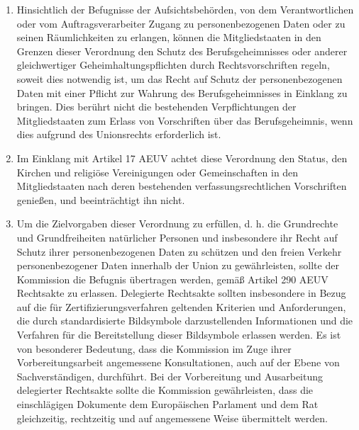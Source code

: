 \begin{enumerate}

   \item Hinsichtlich der Befugnisse der Aufsichtsbehörden, von dem Verantwortlichen oder vom Auftragsverarbeiter Zugang
    zu personenbezogenen Daten oder zu seinen Räumlichkeiten zu erlangen, können die Mitgliedstaaten in den Grenzen
    dieser Verordnung den Schutz des Berufsgeheimnisses oder anderer gleichwertiger Geheimhaltungspflichten durch
    Rechtsvorschriften regeln, soweit dies notwendig ist, um das Recht auf Schutz der personenbezogenen Daten mit einer
    Pflicht zur Wahrung des Berufsgeheimnisses in Einklang zu bringen. Dies berührt nicht die bestehenden
    Verpflichtungen der Mitgliedstaaten zum Erlass von Vorschriften über das Berufsgeheimnis, wenn dies aufgrund des
    Unionsrechts erforderlich ist.%
   \label{eg:164}
   

   \item Im Einklang mit Artikel 17 AEUV achtet diese Verordnung den Status, den Kirchen und religiöse Vereinigungen
    oder Gemeinschaften in den Mitgliedstaaten nach deren bestehenden verfassungsrechtlichen Vorschriften genießen, und
    beeinträchtigt ihn nicht.%
   \label{eg:165}
   

   \item Um die Zielvorgaben dieser Verordnung zu erfüllen, d. h. die Grundrechte und Grundfreiheiten natürlicher
    Personen und insbesondere ihr Recht auf Schutz ihrer personenbezogenen Daten zu schützen und den freien Verkehr
    personenbezogener Daten innerhalb der Union zu gewährleisten, sollte der Kommission die Befugnis übertragen werden,
    gemäß Artikel 290 AEUV Rechtsakte zu erlassen. Delegierte Rechtsakte sollten insbesondere in Bezug auf die für
    Zertifizierungsverfahren geltenden Kriterien und Anforderungen, die durch standardisierte Bildsymbole
    darzustellenden Informationen und die Verfahren für die Bereitstellung dieser Bildsymbole erlassen werden. Es ist
    von besonderer Bedeutung, dass die Kommission im Zuge ihrer Vorbereitungsarbeit angemessene Konsultationen, auch
    auf der Ebene von Sachverständigen, durchführt. Bei der Vorbereitung und Ausarbeitung delegierter Rechtsakte sollte
    die Kommission gewährleisten, dass die einschlägigen Dokumente dem Europäischen Parlament und dem Rat gleichzeitig,
    rechtzeitig und auf angemessene Weise übermittelt werden.%
   \label{eg:166}
   

\end{enumerate}
